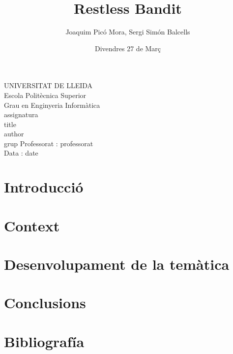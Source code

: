 \documentclass{article}
\title{Restless Bandit}
\author{Joaquim Picó Mora, Sergi Simón Balcells}
\date{Divendres 27 de Març}
\renewcommand{\maketitle}{ %
	\begin{titlepage}
		\raggedright{UNIVERSITAT DE LLEIDA \\
			Escola Politècnica Superior \\
			Grau en Enginyeria Informàtica\\
			\1assignatura\\}
		\vspace{5cm}
		\centering\huge{\5title \\}
		\vspace{3cm}
		\large{\6author} \\
		\normalsize{\3grup}
		\vfill
		Professorat : \4professorat \\
		Data : \7date
\end{titlepage}}
\begin{document}
	\maketitle
	\thispagestyle{empty}
	
	\newpage
	\tableofcontents
	\newpage
	\section{Introducció}
	\section{Context}
	
	\section{Desenvolupament de la temàtica}
	\section{Conclusions}
	\section{Bibliografía}
	
\end{document}
